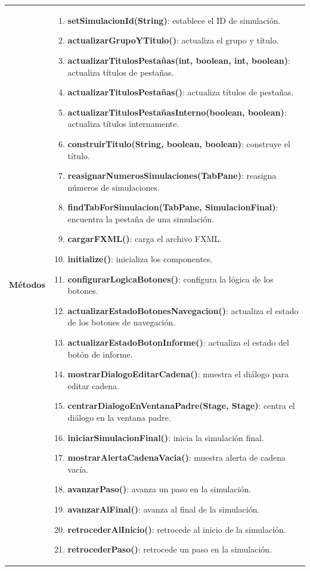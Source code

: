 \begin{longtable}[H]{|>{\columncolor[rgb]{0.63,0.79,0.95}}m{6cm} | m{8.5cm} |}
 \textbf{Métodos} & \begin{enumerate}
 		\item \textbf{setSimulacionId(String)}: establece el ID de simulación.
 		\item \textbf{actualizarGrupoYTitulo()}: actualiza el grupo y título.
 		\item \textbf{actualizarTitulosPestañas(int, boolean, int, boolean)}: actualiza títulos de pestañas.
 		\item \textbf{actualizarTitulosPestañas()}: actualiza títulos de pestañas.
 		\item \textbf{actualizarTitulosPestañasInterno(boolean, boolean)}: actualiza títulos internamente.
 		\item \textbf{construirTitulo(String, boolean, boolean)}: construye el título.
 		\item \textbf{reasignarNumerosSimulaciones(TabPane)}: reasigna números de simulaciones.
 		\item \textbf{findTabForSimulacion(TabPane, SimulacionFinal)}: encuentra la pestaña de una simulación.
 		\item \textbf{cargarFXML()}: carga el archivo FXML.
 		\item \textbf{initialize()}: inicializa los componentes.
 		\item \textbf{configurarLogicaBotones()}: configura la lógica de los botones.
 		\item \textbf{actualizarEstadoBotonesNavegacion()}: actualiza el estado de los botones de navegación.
 		\item \textbf{actualizarEstadoBotonInforme()}: actualiza el estado del botón de informe.
 		\item \textbf{mostrarDialogoEditarCadena()}: muestra el diálogo para editar cadena.
 		\item \textbf{centrarDialogoEnVentanaPadre(Stage, Stage)}: centra el diálogo en la ventana padre.
 		\item \textbf{iniciarSimulacionFinal()}: inicia la simulación final.
 		\item \textbf{mostrarAlertaCadenaVacia()}: muestra alerta de cadena vacía.
 		\item \textbf{avanzarPaso()}: avanza un paso en la simulación.
 		\item \textbf{avanzarAlFinal()}: avanza al final de la simulación.
 		\item \textbf{retrocederAlInicio()}: retrocede al inicio de la simulación.
 		\item \textbf{retrocederPaso()}: retrocede un paso en la simulación.

\end{enumerate}
\end{longtable}
